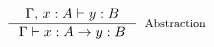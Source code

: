 \documentclass[preview]{standalone}
\begin{document}
$\inference {\Gamma, \, x : A \vdash y : B}{\Gamma \vdash x : A \rightarrow y : B}[Abstraction]$
\end{document}
